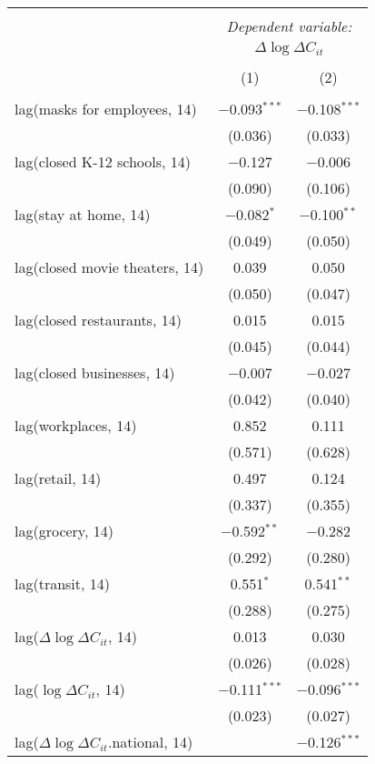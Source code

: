 \begin{tabular}{@{\extracolsep{1pt}}lcc} 
\\[-1.8ex]\hline 
\hline \\[-1.8ex] 
 & \multicolumn{2}{c}{\textit{Dependent variable:}} \\ 
\cline{2-3} 
 & \multicolumn{2}{c}{$\Delta \log \Delta C_{it}$} \\ 
\\[-1.8ex] & (1) & (2)\\ 
\hline \\[-1.8ex] 
 lag(masks for employees, 14) & $-$0.093$^{***}$ & $-$0.108$^{***}$ \\ 
  & (0.036) & (0.033) \\ 
  lag(closed K-12 schools, 14) & $-$0.127 & $-$0.006 \\ 
  & (0.090) & (0.106) \\ 
  lag(stay at home, 14) & $-$0.082$^{*}$ & $-$0.100$^{**}$ \\ 
  & (0.049) & (0.050) \\ 
  lag(closed movie theaters, 14) & 0.039 & 0.050 \\ 
  & (0.050) & (0.047) \\ 
  lag(closed restaurants, 14) & 0.015 & 0.015 \\ 
  & (0.045) & (0.044) \\ 
  lag(closed businesses, 14) & $-$0.007 & $-$0.027 \\ 
  & (0.042) & (0.040) \\ 
  lag(workplaces, 14) & 0.852 & 0.111 \\ 
  & (0.571) & (0.628) \\ 
  lag(retail, 14) & 0.497 & 0.124 \\ 
  & (0.337) & (0.355) \\ 
  lag(grocery, 14) & $-$0.592$^{**}$ & $-$0.282 \\ 
  & (0.292) & (0.280) \\ 
  lag(transit, 14) & 0.551$^{*}$ & 0.541$^{**}$ \\ 
  & (0.288) & (0.275) \\ 
  lag($\Delta \log \Delta C_{it}$, 14) & 0.013 & 0.030 \\ 
  & (0.026) & (0.028) \\ 
  lag($\log \Delta C_{it}$, 14) & $-$0.111$^{***}$ & $-$0.096$^{***}$ \\ 
  & (0.023) & (0.027) \\ 
  lag($\Delta \log \Delta C_{it}$.national, 14) &  & $-$0.126$^{***}$ \\ 

\end{tabular}
